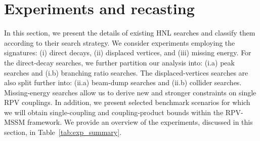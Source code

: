 \section{Experiments and recasting}\label{sec:exp}
In this section, we present the details of existing HNL searches and classify them according to their search 
strategy. We consider experiments employing the signatures: (i) direct decays, (ii) displaced vertices, and (iii) 
missing energy. For the direct-decay searches, we further partition our analysis into: (i.a) peak searches and (i.b) 
branching ratio searches. The displaced-vertices searches are also split further into: (ii.a) beam-dump searches 
and (ii.b) collider searches.
Missing-energy searches allow us to derive new and stronger constraints on single RPV couplings. In addition, we present 
selected benchmark scenarios for which we will obtain single-coupling and coupling-product bounds within the RPV-MSSM 
framework. We provide an  overview of the experiments, discussed in this section, in Table~\ref{tab:exp_summary}.


